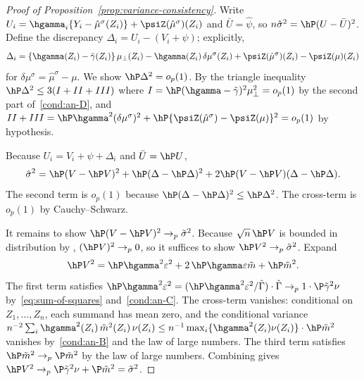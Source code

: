 \documentclass{article}
\begin{document}
\begin{proof}[Proof of Proposition~\ref{prop:variance-consistency}]
Write $U_i
= \hgamma_i\{Y_i - \hat\mu^\sigma(Z_i)\}
  + \psiZ(\hat\mu^\sigma)(Z_i)$
and $\bar U = \hat\psi$,
so $n\hat\sigma^2 = \hP(U - \bar U)^2$.
Define the discrepancy
$\Delta_i = U_i - (V_i + \psi)$; explicitly,
\[
\Delta_i
= \{\hgamma(Z_i) - \tilde\gamma(Z_i)\}\, \mu_\perp(Z_i)
  - \hgamma(Z_i)\,\delta\mu^\sigma(Z_i)
  + \psiZ(\hat\mu^\sigma)(Z_i) - \psiZ(\mu)(Z_i)
\]
for $\delta\mu^\sigma = \hat\mu^\sigma - \mu$.
We show $\hP\Delta^2 = o_p(1)$.
By the triangle inequality
$\hP\Delta^2 \le 3(I + II + III)$
where
$I = \hP(\hgamma - \tilde\gamma)^2 \mu_\perp^2 = o_p(1)$
by the second part of~\ref{cond:an-D},
and $II + III
= \hP\hgamma^2(\delta\mu^\sigma)^2
  + \hP\{\psiZ(\hat\mu^\sigma) - \psiZ(\mu)\}^2
= o_p(1)$
by hypothesis.

Because $U_i = V_i + \psi + \Delta_i$
and $\bar U = \hP U$,
\[
\hat\sigma^2
= \hP(V - \hP V)^2
+ \hP(\Delta - \hP\Delta)^2
+ 2\hP(V - \hP V)(\Delta - \hP\Delta).
\]
The second term is $o_p(1)$
because $\hP(\Delta - \hP\Delta)^2 \le \hP\Delta^2$.
The cross-term is $o_p(1)$
by Cauchy--Schwarz.

It remains to show
$\hP(V - \hP V)^2 \to_p \tilde\sigma^2$.
Because $\sqrt{n}\,\hP V$
is bounded in distribution by
,
$(\hP V)^2 \to_p 0$,
so it suffices to show
$\hP V^2 \to_p \tilde\sigma^2$.
Expand
\[
\hP V^2
= \hP\hgamma^2\varepsilon^2
+ 2\,\hP\hgamma\varepsilon \tilde m
+ \hP \tilde m^2.
\]
The first term satisfies
$\hP\hgamma^2\varepsilon^2
= (\hP\hgamma^2\varepsilon^2/\hat\Gamma)
  \cdot \hat\Gamma
\to_p 1 \cdot \P\tilde\gamma^2\nu$
by~\eqref{eq:sum-of-squares} and~\ref{cond:an-C}.
The cross-term vanishes:
conditional on $Z_1, \ldots, Z_n$,
each summand has mean zero,
and the conditional variance
$n^{-2}\sum_i \hgamma^2(Z_i)\, \tilde m^2(Z_i)\, \nu(Z_i)
\le n^{-1}\max_i\{\hgamma^2(Z_i)\nu(Z_i)\}
  \cdot \hP \tilde m^2$
vanishes by~\ref{cond:an-B}
and the law of large numbers.
The third term satisfies
$\hP \tilde m^2 \to_p \P \tilde m^2$
by the law of large numbers.
Combining gives
$\hP V^2 \to_p \P\tilde\gamma^2\nu + \P\tilde m^2
= \tilde\sigma^2$.
\end{proof}
\end{document}
